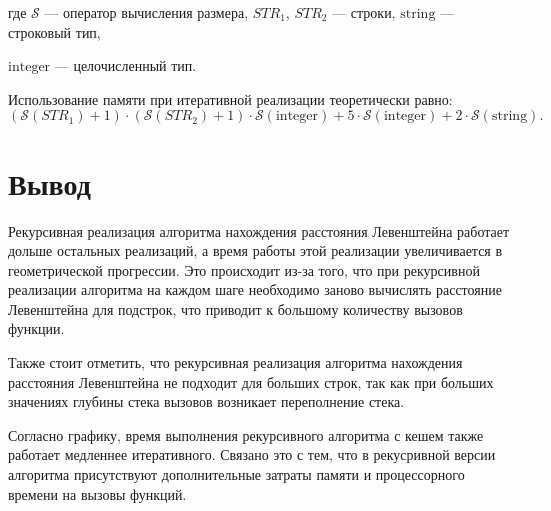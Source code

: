 \noindent где $\mathcal{S}$ — оператор вычисления размера, $STR_1$, $STR_2$ — строки, $\mathrm{string}$ — строковый тип,

\noindent $\mathrm{integer}$ — целочисленный тип.

Использование памяти при итеративной реализации теоретически равно:
\begin{equation}
(\mathcal{S}(STR_1) + 1) \cdot (\mathcal{S}(STR_2) + 1) \cdot \mathcal{S}\mathrm{(integer)} + 5\cdot \mathcal{S}\mathrm{(integer)} + 2 \cdot \mathcal{S}\mathrm{(string)}.
\end{equation}

\section*{Вывод}

Рекурсивная реализация алгоритма нахождения расстояния Левенштейна работает дольше остальных реализаций, а
время работы этой реализации увеличивается в геометрической прогрессии.
Это происходит из-за того, что при рекурсивной реализации алгоритма на каждом шаге необходимо заново вычислять расстояние Левенштейна для подстрок,
что приводит к большому количеству вызовов функции.

Также стоит отметить, что рекурсивная реализация алгоритма нахождения расстояния Левенштейна не подходит для больших строк,
так как при больших значениях глубины стека вызовов возникает переполнение стека.

Согласно графику, время выполнения рекурсивного алгоритма с кешем также работает медленнее итеративного.
Связано это с тем, что в рекусривной версии алгоритма присутствуют дополнительные затраты памяти и процессорного времени на вызовы функций.
